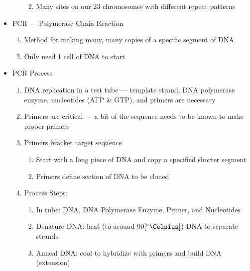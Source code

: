 \documentclass[12pt]{article}
\begin{document}
\begin{itemize}
\begin{enumerate}
\begin{enumerate}
\begin{enumerate}
            \end{enumerate}

          \item Many sites on our 23 chromosomes with different repeat patterns

        \end{enumerate}

    \end{enumerate}

  \item PCR — Polymerase Chain Reaction

    \begin{enumerate}

      \item Method for making many, many copies of a specific segment of DNA

      \item Only need 1 cell of DNA to start

    \end{enumerate}

  \item PCR Process

    \begin{enumerate}

      \item DNA replication in a test tube — template strand, DNA polymerase enzyme, nucleotides (ATP \& GTP), and primers are necessary

      \item Primers are critical — a bit of the sequence needs to be known to make proper primers

      \item Primers bracket target sequence

        \begin{enumerate}

          \item Start with a long piece of DNA and copy a specified shorter segment

          \item Primers define section of DNA to be cloned

        \end{enumerate}

      \item Process Steps:

        \begin{enumerate}

          \item In tube: DNA, DNA Polymerase Enzyme, Primer, and Nucleotides

          \item Denature DNA: heat (to around $90[\si{\degree\Celsius}]$) DNA to separate strands

          \item Anneal DNA: cool to hybridize with primers and build DNA (extension)

        \end{enumerate}

    \end{enumerate}

\end{itemize}
\end{document}
